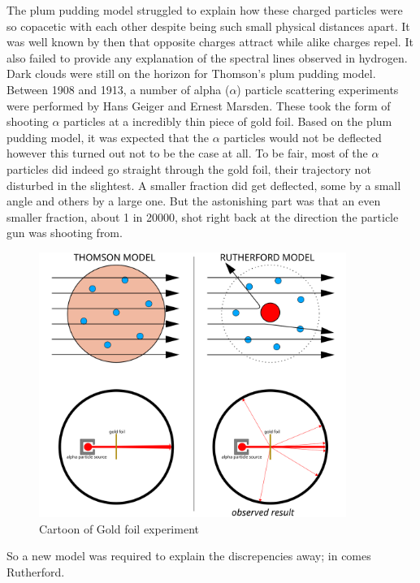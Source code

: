 The plum pudding model struggled to explain how these charged particles were so copacetic with each other despite being such small physical distances apart.
It was well known by then that opposite charges attract while alike charges repel.
It also failed to provide any explanation of the spectral lines observed in hydrogen.
Dark clouds were still on the horizon for Thomson's plum pudding model.
Between 1908 and  1913, a number of alpha ($\alpha$) particle scattering experiments were performed by Hans Geiger and Ernest Marsden.
These took the form of shooting $\alpha$  particles at a  incredibly thin piece of gold foil.
Based on the plum pudding model, it was expected that the $\alpha$ particles would not be deflected however this turned out not to be the case at all.
To be fair, most of the $\alpha$ particles did indeed go straight through the gold foil, their trajectory not disturbed in the slightest.
A smaller fraction did get deflected, some by a small angle and others by a large one.
But the astonishing part was that an even smaller fraction, about 1 in 20000, shot right back at the direction the particle gun was shooting from.

\begin{figure}[H]
  \centering
  \includegraphics[width=100mm]{figures/goldFoil.png}
  \caption{Cartoon of Gold foil experiment}
  \label{goldFoil}
\end{figure}

So a new model was required to explain the discrepencies away; in comes Rutherford.




